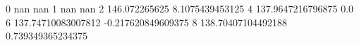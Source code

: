 0 nan nan
1 nan nan
2 146.072265625 8.1075439453125
4 137.9647216796875 0.0
6 137.74710083007812 -0.217620849609375
8 138.70407104492188 0.739349365234375
